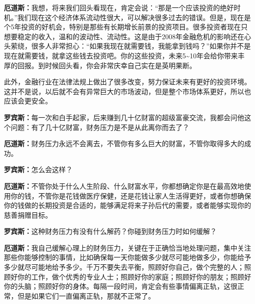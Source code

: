 \begin{BookQuote}
\textbf{厄道斯：}我想，将来我们回头看现在，肯定会说：“那是一个应该投资的绝好时机。”我们现在这个经济体系流动性很大，可以解决很多过去的错误。但是，现在是个5年投资的好机会，特别是那些有长期增长前景的投资项目。很多投资者现在只想要稳定的收入，温和的波动性、流动性。这是由于2008年金融危机的影响还在心头萦绕，很多人非常担心：“如果我现在就需要钱，我能拿到钱吗？”如果你并不是现在就需要钱，就拿这些钱去投资吧。你的这些投资，未来5\textasciitilde{}10年会给你带来丰厚的回报。到时候回头看，你会非常庆幸自己实在是英明果断。
\end{BookQuote}

此外，金融行业在法律法规上做出了很多改变，努力保证未来有更好的投资环境。这并不是说，以后就不会有异常巨大的市场波动，但是整个市场体系更好，所以也应该会更安全。

\begin{BookQuote}
\textbf{罗宾斯：}每一次和白手起家，后来赚到几十亿财富的超级富豪交流，我都会问他这个问题：有了几十亿财富，财务压力是不是从此离你而去了？
\end{BookQuote}

\begin{BookQuote}
\textbf{厄道斯：}财务压力永远不会离去，不管你有多么巨大的财富，不管你取得多大的成功。
\end{BookQuote}

\begin{BookQuote}
\textbf{罗宾斯：}怎么会这样？
\end{BookQuote}

\begin{BookQuote}
\textbf{厄道斯：}不管你处于什么人生阶段、什么财富水平，你都想确定你是在最高效地使用你的钱，不管你是花钱做医疗保健，还是花钱让家人生活得更好，或者你想确保你的钱做的长期投资是合适的，能够满足将来子孙后代的需要，或者能够实现你的慈善捐赠目标。
\end{BookQuote}

\begin{BookQuote}
\textbf{罗宾斯：}这种财务压力有没有什么解药？你碰到财务压力时如何缓解？
\end{BookQuote}

\begin{BookQuote}
\textbf{厄道斯：}我自己缓解心理上的财务压力，关键在于正确恰当地处理问题，集中关注那些你能够控制的事情，比如确保每一天你能做多少就尽可能地做多少，你能给予多少就尽可能地给予多少。千万不要失去平衡，照顾好你自己，做个完整的人；照顾好你的工作，做个优秀的专业人士；照顾好你的家庭；照顾好你的朋友；照顾好你的头脑；照顾好你的身体。每隔一段时间，肯定会有些事情偏离正轨，这很正常，但是如果它们一直偏离正轨，那就不正常了。
\end{BookQuote}

